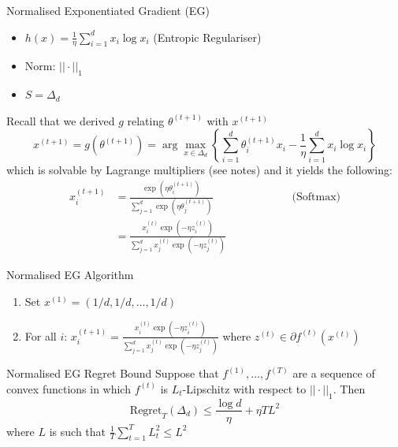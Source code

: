 \begin{frame}{Normalised Exponentiated Gradient (EG)}
\begin{itemize}
    \item $h(x) = \frac{1}{\eta}\sum_{i=1}^d x_i \log x_i$ (Entropic Regulariser)
    \item Norm: $||\cdot||_1$
    \item $S = \Delta_d$
\end{itemize}\pause

Recall that we derived $g$ relating $\theta^{(t+1)}$ with $x^{(t+1)}$ \pause
\begin{equation*}
    x^{(t+1)} = g(\theta^{(t+1)}) = \arg\max_{x \in \Delta_d} \left\{\sum_{i=1}^d \theta_i^{(t+1)}x_i - \frac{1}{\eta}\sum_{i=1}^d x_i \log x_i\right\}
\end{equation*} which is solvable by Lagrange multipliers (see notes) and it yields the following:
\begin{align*}
    x_i^{(t+1)} &= \frac{\exp(\eta \theta_i^{(t+1)})}{\sum_{j=1}^d \exp(\eta \theta_j^{(t+1)})} \hspace{3cm}\text{(Softmax)}\\
    &=\frac{x_i^{(t)} \exp(-\eta z_i^{(t)})}{\sum_{j=1}^d x_j^{(t)} \exp(-\eta z_j^{(t)})}
\end{align*}    
\end{frame}

\begin{frame}{Normalised EG Algorithm}
    \begin{enumerate}
    \item Set $x^{(1)} = (1/d, 1/d, \ldots, 1/d)$
    \item For all $i$: $x_i^{(t+1)} =\frac{x_i^{(t)} \exp(-\eta z_i^{(t)})}{\sum_{j=1}^d x_j^{(t)} \exp(-\eta z_j^{(t)})} $ where $z^{(t)} \in \partial f^{(t)}(x^{(t)})$
\end{enumerate}
\pause
\begin{block}{Normalised EG Regret Bound}
    Suppose that $f^{(1)}, \ldots, f^{(T)}$ are a sequence of convex functions in which $f^{(t)}$ is $L_t$-Lipschitz with respect to $||\cdot||_1$. Then
    \begin{equation*}
        \text{Regret}_T(\Delta_d) \leq \frac{\log d}{\eta} + \eta TL^2
    \end{equation*}
    where $L$ is such that $\frac{1}{T}\sum_{t=1}^TL_t^2 \leq L^2$
\end{block}
\end{frame}

